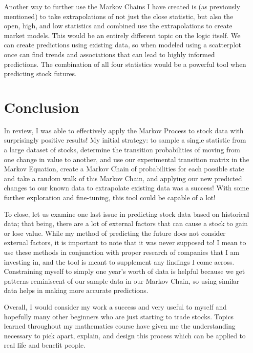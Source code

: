 \documentclass[12pt,final]{article}
\begin{document}
Another way to further use the Markov Chains I have created is (as previously mentioned) to take extrapolations of 
not just the close statistic, but also the open, high, and low statistics and combined use the extrapolations to 
create market models. This would be an entirely different topic on the logic itself. We can create
predictions using existing data, so when modeled using a scatterplot once can find trends and associations
that can lead to highly informed predictions. The combination of all four statistics would be a powerful tool
when predicting stock futures.

\section{Conclusion}

In review, I was able to effectively apply the Markov Process to stock data with surprisingly positive results!
My initial strategy: to sample a single statistic from a large dataset of stocks, determine the transition
probabilities of moving from one change in value to another, and use our experimental transition matrix in the
Markov Equation, create a Markov Chain of probabilities for each possible state and take a random walk of this
Markov Chain, and applying our new predicted changes to our known data to extrapolate existing data was a
success! With some further exploration and fine-tuning, this tool could be capable of a lot!

To close, let us examine one last issue in predicting stock data based on historical data; that being, there
are a lot of external factors that can cause a stock to gain or lose value. While my method of predicting the
future does not consider external factors, it is important to note that it was never
supposed to! I mean to use these methods in conjunction with proper research of companies that I am investing
in, and the tool is meant to supplement any findings I come across. Constraining myself to simply one year's
worth of data is helpful because we get patterns reminiscent of our sample data in our Markov Chain, so using
similar data helps in making more accurate predictions.

Overall, I would consider my work a success and very useful to myself and hopefully many other beginners who
are just starting to trade stocks. Topics learned throughout my mathematics course have given me the understanding
necessary to pick apart, explain, and design this process which can be applied to real life and 
benefit people.
\end{document}
